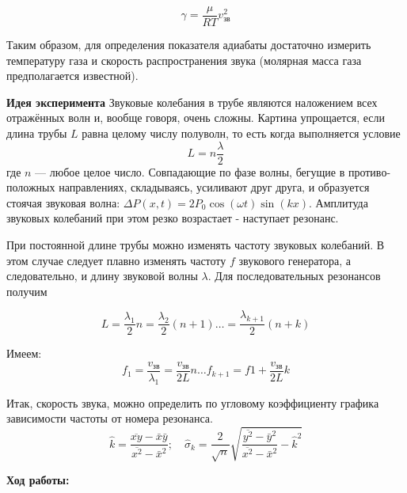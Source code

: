 \documentclass[10pt]{article}
\begin{document}
    \begin{equation}
        \gamma = \frac{\mu}{RT}v_\text{зв}^2
    \end{equation}

    Таким образом, для определения показателя адиабаты достаточно измерить температуру газа и скорость распространения звука (молярная масса газа предполагается известной).

    \textbf{Идея эксперимента}
    Звуковые колебания в трубе являются наложением всех отражённых волн и, вообще говоря, очень сложны. Картина упрощается, если длина трубы $L$ равна целому числу полуволн, то есть когда выполняется условие
    \begin{equation}
        L = n\frac{\lambda}{2}
    \end{equation}
    где $n$ — любое целое число. Совпадающие по фазе волны, бегущие в противо- положных направлениях, складываясь, усиливают друг друга, и образуется стоячая звуковая волна:
    $\Delta P(x,t) = 2P_0 \cos (\omega t) \sin (kx)$.
    Амплитуда звуковых колебаний при этом резко возрастает - наступает резонанс.

    При постоянной длине трубы можно изменять частоту звуковых колебаний. В этом случае следует плавно изменять частоту $f$ звукового генератора, а следовательно, и длину звуковой волны $\lambda$. Для последовательных резонансов получим

    \begin{equation}
        L = \frac{\lambda_1}{2} n =  \frac{\lambda_2}{2} (n+1) \dots  = \frac{\lambda_{k+1}}{2} (n+k)
    \end{equation}
    
    Имеем:
    \begin{equation}
        f_1 = \frac{v_{\text{зв}}}{\lambda_1} = \frac{v_{\text{зв}}}{2L}n \dots f_{k+1} = f1 + \frac{v_{\text{зв}}}{2L}k
    \end{equation}

    Итак, скорость звука, можно определить по угловому коэффициенту графика зависимости частоты от номера резонанса.
     \begin{equation}
        \hat{k} = \frac{\overline{xy} - \bar{x}\bar{y}}{\overline{x^2} - \bar{x}^2} ;\quad \hat{\sigma}_k = \frac{2}{\sqrt{n}}\sqrt{\frac{\overline{y^2} - \bar{y}^2}{\overline{x^2} - \bar{x}^2} - \hat{k}^2}
    \end{equation}

    \textbf{Ход работы:}
\end{document}
